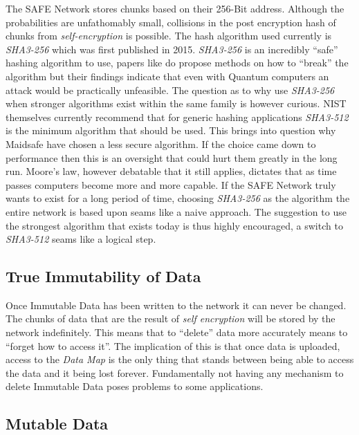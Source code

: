 The SAFE Network stores chunks based on their 256-Bit address. Although the probabilities are unfathomably small, collisions in the post encryption hash of chunks from \textit{self-encryption} is possible. The hash algorithm used currently is \textit{SHA3-256}\cite{dworkin2015sha} which was first published in 2015. \textit{SHA3-256} is an incredibly ``safe'' hashing algorithm to use, papers like \cite{amy2016estimating} do propose methods on how to ``break'' the algorithm but their findings indicate that even with Quantum computers an attack would be practically unfeasible. The question as to why use \textit{SHA3-256} when stronger algorithms exist within the same family is however curious. NIST themselves currently recommend\cite{hash-reccomend} that for generic hashing applications \textit{SHA3-512} is the minimum algorithm that should be used. This brings into question why Maidsafe have chosen a less secure algorithm. If the choice came down to performance then this is an oversight that could hurt them greatly in the long run. Moore's law\cite{schaller1997moore}, however debatable that it still applies, dictates that as time passes computers become more and more capable. If the SAFE Network truly wants to exist for a long period of time, choosing \textit{SHA3-256} as the algorithm the entire network is based upon seams like a naive approach. The suggestion to use the strongest algorithm that exists today is thus highly encouraged, a switch to \textit{SHA3-512} seams like a logical step.

\subsection{True Immutability of Data}
\label{subsec:immutability-of-data}

Once Immutable Data has been written to the network it can never be changed. The chunks of data that are the result of \textit{self encryption} will be stored by the network indefinitely. This means that to ``delete'' data more accurately means to ``forget how to access it''. The implication of this is that once data is uploaded, access to the \textit{Data Map} is the only thing that stands between being able to access the data and it being lost forever. Fundamentally not having any mechanism to delete Immutable Data poses problems to some applications.

\subsection{Mutable Data}

